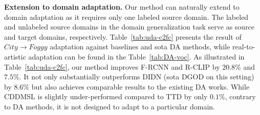 \textbf{Extension to domain adaptation.} Our method can naturally extend to domain adaptation as it requires only one labeled source domain. The labeled and unlabeled source domains in the domain generalization task serve as source and target domains, respectively. Table~\ref{tab:uda-c2fc} presents the result of \emph{$City \rightarrow Foggy$} adaptation against baselines and sota DA methods, while real-to-artistic adaptation can be found in the Table~\ref{tab:DA-voc}. As illustrated in Table~\ref{tab:uda-c2fc}, our method improves F-RCNN and R-CLIP by $20.8\%$ and $7.5\%$.
It not only substantially outperforms DIDN (sota DGOD on this setting) by $8.6\%$ but also achieves comparable results to the existing DA works. While CDDMSL is slightly under-performed compared to TTD by only $0.1\%$, contrary to DA methods, it is not designed to adapt to a particular domain.

